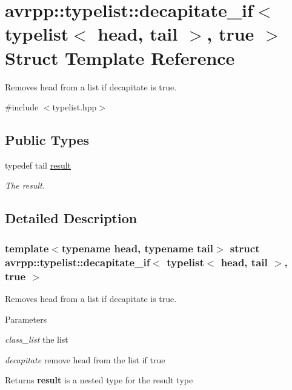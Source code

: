 \hypertarget{structavrpp_1_1typelist_1_1decapitate__if_3_01typelist_3_01head_00_01tail_01_4_00_01true_01_4}{
\section{avrpp::typelist::decapitate\_\-if$<$ typelist$<$ head, tail $>$, true $>$ Struct Template Reference}
\label{structavrpp_1_1typelist_1_1decapitate__if_3_01typelist_3_01head_00_01tail_01_4_00_01true_01_4}
}


Removes head from a list if decapitate is true.  




{\ttfamily \#include $<$typelist.hpp$>$}

\subsection*{Public Types}
\begin{DoxyCompactItemize}
\item 
typedef tail \hyperlink{structavrpp_1_1typelist_1_1decapitate__if_3_01typelist_3_01head_00_01tail_01_4_00_01true_01_4_a3a4f8c2b5ce31c0827cf9f6645553fae}{result}
\begin{DoxyCompactList}\small\item\em The result. \item\end{DoxyCompactList}\end{DoxyCompactItemize}


\subsection{Detailed Description}
\subsubsection*{template$<$typename head, typename tail$>$ struct avrpp::typelist::decapitate\_\-if$<$ typelist$<$ head, tail $>$, true $>$}

Removes head from a list if decapitate is true. 
\begin{DoxyParams}{Parameters}
\item[{\em class\_\-list}]the list \item[{\em decapitate}]remove head from the list if true \end{DoxyParams}
\begin{DoxyReturn}{Returns}
{\bfseries result} is a nested type for the result type 
\end{DoxyReturn}


